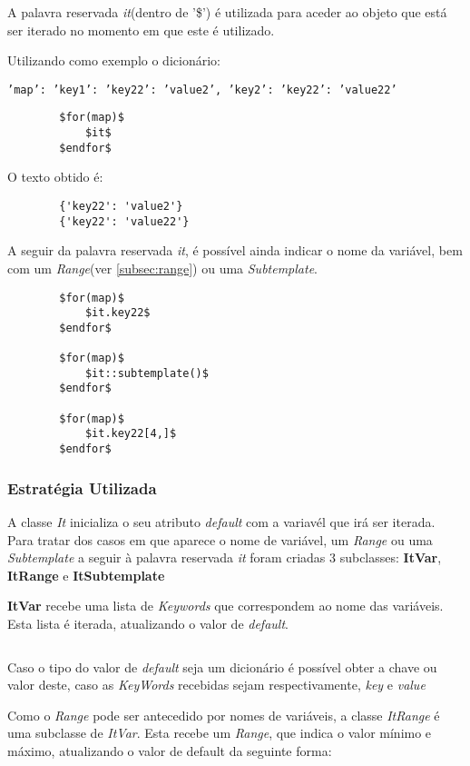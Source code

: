 \documentclass[../relatorio.tex]{subfiles}
\begin{document}
    A palavra reservada \textit{it}(dentro de '\$') é utilizada
    para aceder ao objeto que está ser iterado no momento em que
    este é utilizado.

    Utilizando como exemplo o dicionário:
    
    \texttt{'map': {'key1': {'key22': 'value2'}, 'key2': {'key22': 'value22'}}}

    \begin{verbatim}
        $for(map)$
            $it$
        $endfor$
    \end{verbatim}

    O texto obtido é:
    \begin{verbatim}
        {'key22': 'value2'}
        {'key22': 'value22'}
    \end{verbatim}

    A seguir da palavra reservada \textit{it}, é possível ainda indicar
    o nome da variável, bem com um \textit{Range}(ver \ref{subsec:range})
    ou uma \textit{Subtemplate}.

    \begin{verbatim}
        $for(map)$
            $it.key22$
        $endfor$

        $for(map)$
            $it::subtemplate()$
        $endfor$

        $for(map)$
            $it.key22[4,]$
        $endfor$
    \end{verbatim}

    \subsubsection{Estratégia Utilizada}

    A classe \textit{It} inicializa o seu atributo \textit{default}
    com a variavél que irá ser iterada. Para tratar dos casos em que
    aparece o nome de variável, um \textit{Range} ou uma \textit{Subtemplate}
    a seguir à palavra reservada \textit{it} foram criadas 3 subclasses: \textbf{ItVar}, 
    \textbf{ItRange} e \textbf{ItSubtemplate}


    \textbf{ItVar} recebe uma lista de \textit{Keywords}
    que correspondem ao nome das variáveis. Esta lista é iterada,
    atualizando o valor de \textit{default}. 
    
    \inputminted[firstline=11, lastline=17]{py}{../modules/It/ItVar.py}
    
    Caso o tipo do valor de \textit{default} seja um dicionário é possível obter
    a chave ou valor deste, caso as \textit{KeyWords} recebidas sejam respectivamente,
    \textit{key} e \textit{value}

    Como o \textit{Range} pode ser antecedido por nomes de variáveis, a classe
    \textit{ItRange} é uma subclasse de \textit{ItVar}. Esta recebe um \textit{Range},
    que indica o valor mínimo e máximo, atualizando o valor de default da seguinte forma:
    
    \inputminted[firstline=9, lastline=20]{py}{../modules/It/ItRange.py}

    
    
     
\end{document}
